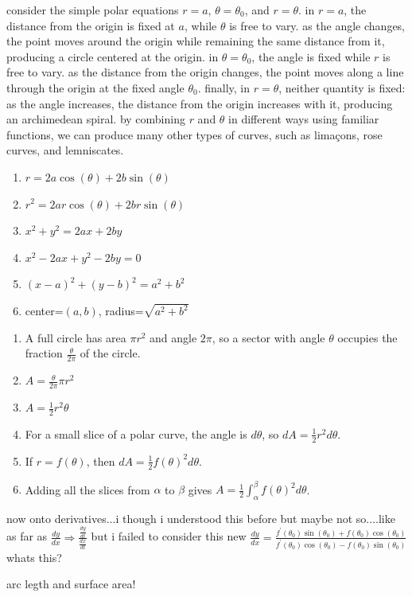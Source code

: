 \documentclass{article}
\begin{document}
consider the simple polar equations $r = a$, $\theta = \theta_0$, and $r = \theta$. in $r = a$, the distance from the origin is fixed at $a$, while $\theta$ is free to vary. as the angle changes, the point moves around the origin while remaining the same distance from it, producing a circle centered at the origin. in $\theta = \theta_0$, the angle is fixed while $r$ is free to vary. as the distance from the origin changes, the point moves along a line through the origin at the fixed angle $\theta_0$. finally, in $r = \theta$, neither quantity is fixed: as the angle increases, the distance from the origin increases with it, producing an archimedean spiral. by combining $r$ and $\theta$ in different ways using familiar functions, we can produce many other types of curves, such as limaçons, rose curves, and lemniscates.\\

\begin{enumerate}
    \item $r = 2a\cos(\theta) + 2b\sin(\theta)$
    \item $r^2 = 2ar\cos(\theta) + 2br\sin(\theta)$
    \item $x^2+y^2 = 2ax+2by$
    \item $x^2-2ax+y^2-2by=0$
    \item $(x-a)^2+(y-b)^2=a^2+b^2$
    \item center=$(a,b)$, radius=$\sqrt{a^2+b^2}$
\end{enumerate}

\vspace{1em}

\begin{enumerate}
    \item A full circle has area $\pi r^2$ and angle $2\pi$, so a sector with angle $\theta$ occupies the fraction $\frac{\theta}{2\pi}$ of the circle.
    
    \item $A = \frac{\theta}{2\pi}\pi r^2$
    
    \item $A = \frac{1}{2}r^2\theta$
    
    \item For a small slice of a polar curve, the angle is $d\theta$, so $dA = \frac{1}{2}r^2d\theta$.
    
    \item If $r=f(\theta)$, then $dA = \frac{1}{2}f(\theta)^2d\theta$.
    
    \item Adding all the slices from $\alpha$ to $\beta$ gives $A = \frac{1}{2}\int_{\alpha}^{\beta}f(\theta)^2d\theta$.
\end{enumerate}






now onto derivatives...i though i understood this before but maybe not so....like as far as $\frac{dy}{dx} \Rightarrow \frac{\frac{dy}{dt}}{\frac{dx}{dt}}$ but i failed to consider this new $\frac{dy}{dx} = \frac{f^{'}(\theta_0)\sin(\theta_0) + f(\theta_0)\cos(\theta_0)}{f^{'}(\theta_0)\cos(\theta_0) - f(\theta_0)\sin(\theta_0)}$ whats this?

arc legth and surface area!
\end{document}
